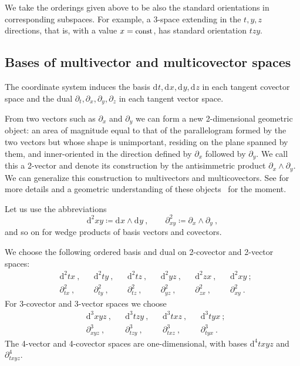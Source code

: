 \documentclass[\ifafour a4paper,12pt,\else a5paper,10pt,\fi%
onecolumn,oneside,article,%
british%
]{memoir}
\theoremstyle{remark}
\theoremstyle{innote}
\newcommand*{\wrench}{{\fontencoding{U}\fontfamily{fontawesomethree}\selectfont\symbol{114}}}
\newcommand{\mynotew}[1]{{\footnotesize\color{notecolour}\wrench\ #1}}
\newcommand*{\de}{\partialup}%
\newcommand*{\di}{\mathrm{d}}%
\newcommand*{\defd}{\coloneqq}
\renewcommand*{\|}[1][]{\nonscript\:#1\vert\nonscript\:\mathopen{}}
\newcommand*{\ddi}[2][]{\di^{#1}#2}
\newcommand*{\dde}[2][]{\de^{#1}_{#2}}
\begin{document}
We take the orderings given above to be also the standard orientations in corresponding subspaces. For example, a 3-space extending in the $t,y,z$ directions, that is, with a value $x=\text{\small const}$, has standard orientation $tzy$.

\subsection{Bases of multivector and multicovector spaces}
\label{sec:bases}

The coordinate system induces the basis $\ddi{t}, \ddi{x}, \ddi{y}, \ddi{z}$ in each tangent covector space and the dual $\dde{t}, \dde{x}, \dde{y}, \dde{z}$ in each tangent vector space.

From two vectors such as $\dde{x}$ and $\dde{y}$ we can form a new 2-dimensional geometric object: an area of magnitude equal to that of the parallelogram formed by the two vectors but whose shape is unimportant, residing on the plane spanned by them, and inner-oriented in the direction defined by $\dde{x}$ followed by $\dde{y}$. We call this a 2-vector and denote its construction by the antisimmetric product $\dde{x}\land\dde{y}$. We can generalize this construction to multivectors and multicovectors. See \textcites{burke1985_r1987,burke1995,burke1983,bossavit1991,schouten1951_r1989} for more details and a geometric understanding of these objects \mynotew{for the moment}.

Let us use the abbreviations
\begin{equation}
  \label{eq:abbrev_dide}
  \ddi[2]{xy} \defd \ddi{x}\land\ddi{y}\ ,
  \qquad
  \dde[2]{xy} \defd \dde{x}\land\dde{y} \ ,
\end{equation}
and so on for wedge products of basis vectors and covectors.

We choose the following ordered basis and dual on 2-covector and 2-vector spaces:
\begin{equation}
  \label{eq:basis_2vector}
  \begin{aligned}
  &\ddi[2]{tx}\ , 
  &&\ddi[2]{ty}\ , 
  &&\ddi[2]{tz}\ , 
  &&\ddi[2]{yz}\ , 
  &&\ddi[2]{zx}\ ,
  &&\ddi[2]{xy}\ ;\\
  &\dde[2]{tx}\ , 
  &&\dde[2]{ty}\ , 
  &&\dde[2]{tz}\ , 
  &&\dde[2]{yz}\ , 
  &&\dde[2]{zx}\ , 
  &&\dde[2]{xy} \ .
\end{aligned}
\end{equation}
For 3-covector and 3-vector spaces we choose
\begin{equation}
  \label{eq:basis_3vector}
  \begin{aligned}
  &\ddi[3]{xyz}\ ,
  &&\ddi[3]{tzy}\ ,
  &&\ddi[3]{txz}\ ,
  &&\ddi[3]{tyx}\ ;\\
  &\dde[3]{xyz}\ ,
  &&\dde[3]{tzy}\ ,
  &&\dde[3]{txz}\ ,
  &&\dde[3]{tyx}\ .
\end{aligned}
\end{equation}
The 4-vector and 4-covector spaces are one-dimensional, with bases $\ddi[4]{txyz}$ and $\dde[4]{txyz}$.
\end{document}
